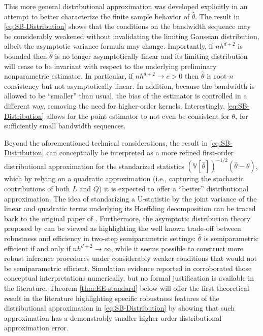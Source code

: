 \documentclass[11pt]{article}
\numberwithin{equation}{section}
\theoremstyle{definition}
\newcommand{\V}{\mathbb{V}}
\begin{document}
This more general distributional approximation was developed explicitly in an attempt to better characterize the finite sample behavior of $\widehat{\theta}$. The result in \eqref{eq:SB-Distribution} shows that the conditions on the bandwidth sequence may be
considerably weakened without invalidating the limiting Gaussian distribution, albeit the asymptotic variance formula may change. Importantly, if $nh^{d+2} $ is bounded then $\widehat{\theta}$ is no longer asymptotically linear and its limiting distribution will cease to be invariant with respect to the underlying preliminary nonparametric estimator. In particular, if $nh^{d+2}\to c >0$ then $\widehat{\theta}$ is root-$n$ consistency but not asymptotically linear. In addition, because the bandwidth is allowed to be ``smaller'' than usual, the bias of the estimator is controlled in a different way, removing the need for higher-order kernels. Interestingly, \eqref{eq:SB-Distribution} allows for the point estimator to not even be consistent for $\theta$, for sufficiently small bandwidth sequences.

Beyond the aforementioned technical considerations, the result in \eqref{eq:SB-Distribution} can conceptually be interpreted as a more refined first-order distributional approximation for the standarized statistics $(\V[\widehat{\theta}])^{-1/2}(\widehat{\theta}-\theta)$, which by relying on a quadratic approximation (i.e., capturing the stochastic contributions of both $\bar{L}$ and $\bar{Q}$) it is expected to offer a ``better'' distributional approximation. The idea of standarizing a U-statistic by the joint variance of the linear and quadratic terms underlying its Hoeffding decomposition can be traced back to the original paper of \citet[p. 307]{Hoeffding_1948_IMS}. Furthermore, the asymptotic distribution theory proposed by \citet{Cattaneo-Crump-Jansson_2014a_ET} can be viewed as highlighting the well known trade-off between robustness and efficiency in two-step semiparametric settings: $\widehat{\theta}$ is semiparametric efficient if and only if $nh^{d+2}\to\infty$, while it seems possible to construct more robust inference procedures under considerably weaker conditions that would not be semiparametric efficient. Simulation evidence reported in \citet{Cattaneo-Crump-Jansson_2010_JASA,Cattaneo-Crump-Jansson_2014a_ET,Cattaneo-Crump-Jansson_2014b_ET} corroborated those conceptual interpretations numerically, but no formal justification is available in the literature. Theorem \ref{thm:EE-standard} below will offer the first theoretical result in the literature highlighting specific robustness features of the distributional approximation in \eqref{eq:SB-Distribution} by showing that such approximation has a demonstrably smaller higher-order distributional approximation error.  
\end{document}
